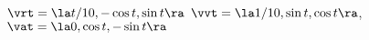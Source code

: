 {$\vrt = \la t/10,-\cos t,\sin t\ra$
}
{
$\vvt = \la 1/10, \sin t, \cos t\ra$, $\vat = \la 0,\cos t, -\sin t \ra$}

